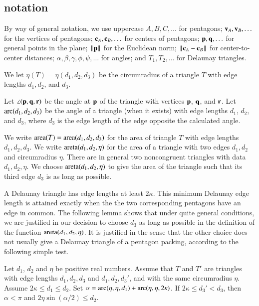 \subsection{notation}

By way of general notation, we use uppercase $A,B,C,\ldots$ for
pentagons; ${\mathbf v}_A,{\mathbf v}_B,\ldots$ for the vertices of pentagons;
${\mathbf c}_A,{\mathbf c}_B,\ldots$ for centers of pentagons; ${\mathbf p},{\mathbf q},\ldots$ for
general points in the plane; ${\hbox{\ensuremath{\hspace{0.1em}|\hspace{-0.1em}|\hspace{0.1em}}}{\mathbf p}\hbox{\ensuremath{\hspace{0.1em}|\hspace{-0.1em}|\hspace{0.1em}}}}$ for the Euclidean norm;
$\norm{\c_A}{\c_B}$ for center-to-center distances;
$\alpha,\beta,\gamma,\phi,\psi,\ldots$ for angles; and $T_1,T_2,\ldots$
for Delaunay triangles.

We let $\eta(T) = \eta(d_1,d_2,d_3)$ be the circumradius of a triangle
$T$ with edge lengths $d_1,d_2$, and $d_3$.

Let $\angle({\mathbf p},{\mathbf q},{\mathbf r})$ be the angle at ${\mathbf p}$ of the triangle with
vertices ${\mathbf p}$, ${\mathbf q}$, and ${\mathbf r}$.  Let $\operatorname{arc}(d_1,d_2,d_3)$ be the angle
of a triangle (when it exists) with edge lengths $d_1$, $d_2$, and
$d_3$, where $d_3$ is the edge length of the edge opposite the
calculated angle.




We write ${\operatorname{area}}(T)= {\operatorname{area}}(d_1,d_2,d_3)$ for the area of triangle $T$
with edge lengths $d_1,d_2,d_3$.  We write
${\operatorname{areta}}(d_1,d_2,\eta)$ for the area of a triangle with two edges
$d_1,d_2$ and circumradius $\eta$.  There are in general two
noncongruent triangles with data $d_1,d_2,\eta$.  We choose
${\operatorname{areta}}(d_1,d_2,\eta)$ to give the area of the triangle such that its
third edge $d_3$ is as long as possible.

A Delaunay triangle has edge lengths at least $2\kappa$.  This minimum
Delaunay edge length is attained exactly when the the two
corresponding pentagons have an edge in common.  The following lemma
shows that under quite general conditions, we are justified in our
decision to choose $d_3$ as long as possible in the definition of the
function ${\operatorname{areta}}(d_1,d_2,\eta)$.  It is justified in the sense that
the other choice does not usually give a Delaunay triangle of a pentagon
packing, according to the following simple test.

\begin{lemma}\label{lemma:areta}  Let $d_1$, $d_2$
and  $\eta$ be positive real numbers.
Assume that $T$ and $T'$ are triangles with edge lengths
$d_1,d_2,d_3$ and $d_1,d_2,d_3'$,  and with the same circumradius
$\eta$. Assume $2\kappa\le d_1\le d_2$.  Set
 $\alpha = \operatorname{arc}(\eta,\eta,d_1)+\operatorname{arc}(\eta,\eta,2\kappa)$.
If $2\kappa \le d_3' < d_3$, then $\alpha < \pi$ and $2\eta\sin(\alpha/2) \le d_2$.
\end{lemma}

